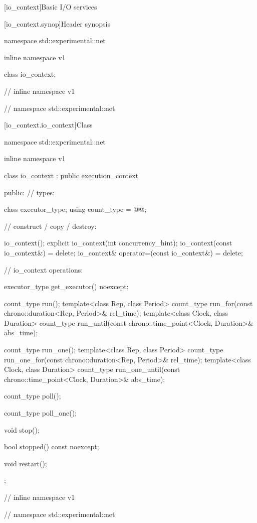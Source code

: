 
[io_context]{Basic I/O services}


%
[io_context.synop]{Header  synopsis}

\begin{codeblock}
namespace std::experimental::net {
inline namespace v1 {

  class io_context;

} // inline namespace v1
} // namespace std::experimental::net
\end{codeblock}



[io_context.io_context]{Class }

%
\begin{codeblock}
namespace std::experimental::net {
inline namespace v1 {

  class io_context : public execution_context
  {
  public:
    // types:

    class executor_type;
    using count_type = @@;

    // construct / copy / destroy:

    io_context();
    explicit io_context(int concurrency_hint);
    io_context(const io_context&) = delete;
    io_context& operator=(const io_context&) = delete;

    // io_context operations:

    executor_type get_executor() noexcept;

    count_type run();
    template<class Rep, class Period>
      count_type run_for(const chrono::duration<Rep, Period>& rel_time);
    template<class Clock, class Duration>
      count_type run_until(const chrono::time_point<Clock, Duration>& abs_time);

    count_type run_one();
    template<class Rep, class Period>
      count_type run_one_for(const chrono::duration<Rep, Period>& rel_time);
    template<class Clock, class Duration>
      count_type run_one_until(const chrono::time_point<Clock, Duration>& abs_time);

    count_type poll();

    count_type poll_one();

    void stop();

    bool stopped() const noexcept;

    void restart();
  };

} // inline namespace v1
} // namespace std::experimental::net
\end{codeblock}


